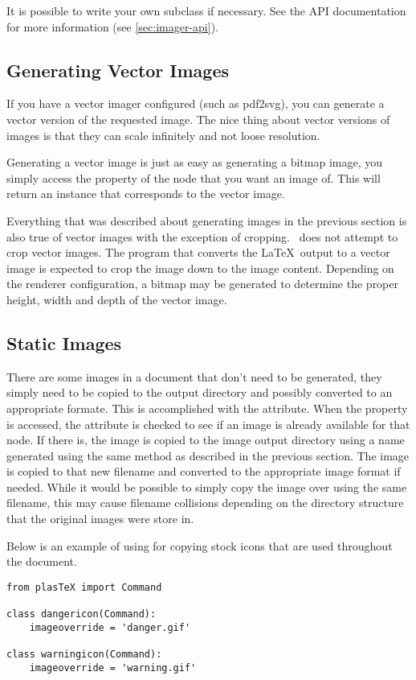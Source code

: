 It is possible to write your own  subclass if necessary.
See the  API documentation for more information (see
\ref{sec:imager-api}).


\subsection{Generating Vector Images}

If you have a vector imager configured (such as pdf2svg), you
can generate a vector version of the requested image. The nice thing about
vector versions of images is that they can scale infinitely and not loose
resolution.

Generating a vector image is just as easy as generating a bitmap image,
you simply access the  property of the node that
you want an image of.  This will return an 
instance that corresponds to the vector image.

Everything that was described about generating images in the previous
section is also true of vector images with the exception of cropping.
\plasTeX\ does not attempt to crop vector images.  The program that
converts the \LaTeX\ output to a vector image is expected to crop the
image down to the image content.  Depending on the renderer configuration, a
bitmap may be generated to determine the proper height, width and depth of
the vector image.


\subsection{Static Images}

There are some images in a document that don't need to be generated, they
simply need to be copied to the output directory and possibly converted
to an appropriate formate.  This is accomplished with the
 attribute.  When the  property
is accessed, the  attribute is checked to see if
an image is already available for that node.  If there is, the image
is copied to the image output directory using a name generated
using the same method as described in the previous section.  The image
is copied to that new filename and converted to the appropriate
image format if needed.  While it would be possible to simply copy the
image over using the same filename, this may cause filename collisions
depending on the directory structure that the original images were
store in.

Below is an example of using  for copying
stock icons that are used throughout the document.
\begin{verbatim}
from plasTeX import Command

class dangericon(Command):
    imageoverride = 'danger.gif'

class warningicon(Command):
    imageoverride = 'warning.gif'
\end{verbatim}

